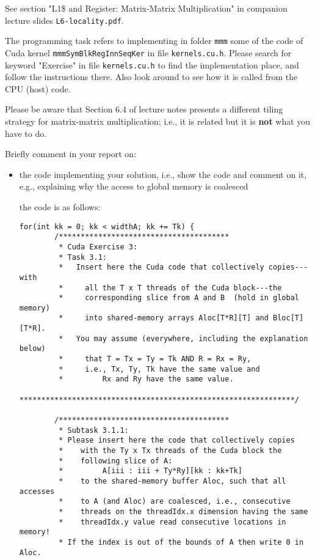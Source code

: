 \documentclass{article}
\begin{document}
See section "L1\$ and Register: Matrix-Matrix Multiplication" in companion lecture slides \texttt{L6-locality.pdf}.

The programming task refers to implementing in folder \texttt{mmm} some of the code of Cuda kernel \texttt{mmmSymBlkRegInnSeqKer} in file \texttt{kernels.cu.h}. Please search for keyword "Exercise" in file \texttt{kernels.cu.h} to find the implementation place, and follow the instructions there. Also look around to see how it is called from the CPU (host) code.

Please be aware that Section 6.4 of lecture notes presents a different tiling
strategy for matrix-matrix multiplication; i.e., it is related but it is \textbf{not}
what you have to do.

Briefly comment in your report on:

\begin{itemize}
    \item the code implementing your solution, i.e., show the code and comment on it,
    e.g., explaining why the access to global memory is coalesced

    the code is as follows:

    \begin{lstlisting}[language=cuda]
        for(int kk = 0; kk < widthA; kk += Tk) {
        /***************************************
         * Cuda Exercise 3:
         * Task 3.1:
         *   Insert here the Cuda code that collectively copies---with 
         *     all the T x T threads of the Cuda block---the
         *     corresponding slice from A and B  (hold in global memory)
         *     into shared-memory arrays Aloc[T*R][T] and Bloc[T][T*R].
         *   You may assume (everywhere, including the explanation below)
         *     that T = Tx = Ty = Tk AND R = Rx = Ry,
         *     i.e., Tx, Ty, Tk have the same value and 
         *         Rx and Ry have the same value.
         ***************************************************************/
  
        /***************************************
         * Subtask 3.1.1:
         * Please insert here the code that collectively copies 
         *    with the Ty x Tx threads of the Cuda block the 
         *    following slice of A: 
         *         A[iii : iii + Ty*Ry][kk : kk+Tk] 
         *    to the shared-memory buffer Aloc, such that all accesses 
         *    to A (and Aloc) are coalesced, i.e., consecutive
         *    threads on the threadIdx.x dimension having the same
         *    threadIdx.y value read consecutive locations in memory!
         * If the index is out of the bounds of A then write 0 in Aloc.
  

\end{lstlisting}
\end{itemize}
\end{document}
